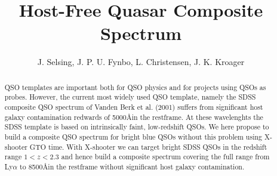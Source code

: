 \documentclass[iop]{emulateapj}
\begin{document}

\title{Host-Free Quasar Composite Spectrum}


\author{J. Selsing, J. P. U. Fynbo, L. Christensen, J. K. Kroager}






\begin{abstract}
QSO templates are important both for QSO physics and for projects using QSOs as probes. However, the current most widely used QSO template, namely the SDSS composite QSO spectrum of Vanden Berk et al. (2001) suffers from significant host galaxy contamination redwards of 5000\AA in the restframe. At these wavelenghts the SDSS template is based on intrinsically faint, low-redshift QSOs. We here propose to build a composite QSO spectrum for bright blue QSOs without this problem using X-shooter GTO time. With X-shooter we can target bright SDSS QSOs in the redshift range $1 < z < 2.3$ and hence build a composite spectrum covering the full range from Ly$\alpha$ to 8500\AA in the restframe without significant host galaxy contamination.

\end{abstract}
\end{document}

